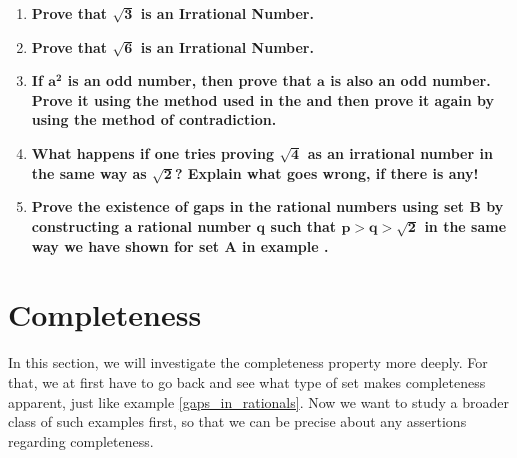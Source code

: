 \exercise
\begin{enumerate}
    \item \textbf{Prove that $\pmb{\sqrt{3}}$ is an Irrational Number.}
    \item \textbf{Prove that $\pmb{\sqrt{6}}$ is an Irrational Number.}
    \item \textbf{If $\pmb{a^2}$ is an odd number, then prove that $\pmb{a}$ is also an odd number. Prove it using the method used in the  and then prove it again by using the method of contradiction.}
    \item \textbf{What happens if one tries proving $\pmb{\sqrt{4}}$ as an irrational number in the same way as $\pmb{\sqrt{2}}$? Explain what goes wrong, if there is any!} 
    \item \textbf{Prove the existence of gaps in the rational numbers using set $\pmb{B}$ by constructing a rational number $\pmb{q}$ such that $\pmb{p>q>\sqrt{2}}$ in the same way we have shown for set $\pmb{A}$ in example \pmb{\eqref{gaps_in_rationals}}.}
\end{enumerate}
\section{Completeness}
In this section, we will investigate the completeness property more deeply. For that, we at first have to go back and see what type of set makes completeness apparent, just like example \eqref{gaps_in_rationals}. Now we want to study a broader class of such examples first, so that we can be precise about any assertions regarding completeness.

